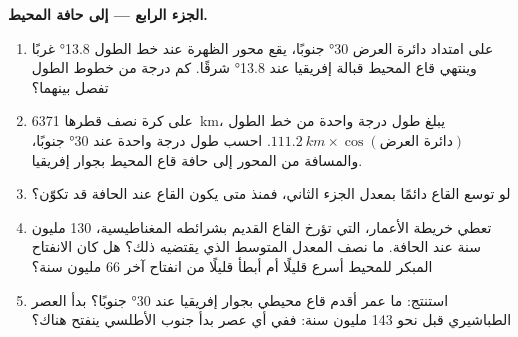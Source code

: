 \begin{problem}
\medskip
\noindent\textbf{الجزء الرابع --- إلى حافة المحيط.}
\begin{enumerate}[resume]
  \item على امتداد دائرة العرض \ang{30} جنوبًا، يقع محور الظهرة عند خط الطول
        \ang{13.8} غربًا وينتهي قاع المحيط قبالة إفريقيا عند
        \ang{13.8} شرقًا. كم درجة من خطوط الطول تفصل بينهما؟
  \item على كرة نصف قطرها \qty{6371}{km}، يبلغ طول درجة واحدة من خط الطول
        $\qty{111.2}{km} \times \cos(\text{دائرة العرض})$. احسب
        طول درجة واحدة عند \ang{30} جنوبًا، والمسافة من
        المحور إلى حافة قاع المحيط بجوار إفريقيا.
  \item لو توسع القاع دائمًا بمعدل الجزء الثاني، فمنذ متى
        يكون القاع عند الحافة قد تكوّن؟
  \item تعطي خريطة الأعمار، التي تؤرخ القاع القديم بشرائطه المغناطيسية،
        \num{130} مليون سنة عند الحافة. ما نصف المعدل المتوسط الذي
        يقتضيه ذلك؟ هل كان الانفتاح المبكر للمحيط أسرع قليلًا أم
        أبطأ قليلًا من انفتاح آخر 66 مليون سنة؟
  \item استنتج: ما عمر أقدم قاع محيطي بجوار إفريقيا عند
        \ang{30} جنوبًا؟ بدأ العصر الطباشيري قبل نحو \num{143} مليون
        سنة: ففي أي عصر بدأ جنوب الأطلسي ينفتح
        هناك؟
\end{enumerate}
\end{problem}
